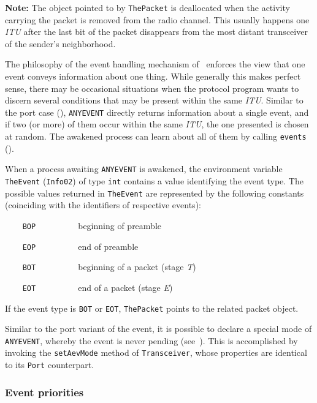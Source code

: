 \medskip

\noindent
{\bf Note:}
The object pointed to by {\tt ThePacket} is deallocated when the activity
carrying the packet is removed from the radio channel.
This usually happens one {\em ITU\/} after the last bit of the packet
disappears from the most distant transceiver of the sender's neighborhood.

\medskip

The philosophy of the event handling mechanism of \smurph\ enforces the
view that one event conveys information about one thing.
While generally this makes perfect sense, there may be occasional situations
when the protocol program wants to discern several conditions that may
be present within the same {\em ITU}.
Similar to the port case (), {\tt ANYEVENT} directly returns
information about a single event, and if
two (or more) of them occur within the same {\em ITU}, the one presented
is chosen at random.
The awakened process can learn about all of them
by calling {\tt events} ().

When a process awaiting {\tt ANYEVENT} is awakened, the environment
variable {\tt TheEvent} ({\tt Info02}) of type {\tt int}
contains a value identifying the event type.
The possible values returned in {\tt TheEvent} are represented by the
following constants (coinciding with the identifiers of respective events):

\bigskip

\noindent
{\tt ~~~~BOP~~~~~~~~~} beginning of preamble

\noindent
{\tt ~~~~EOP~~~~~~~~~} end of preamble

\noindent
{\tt ~~~~BOT~~~~~~~~~} beginning of a packet (stage {\em T\/})

\noindent
{\tt ~~~~EOT~~~~~~~~~} end of a packet (stage {\em E\/})

\bigskip

If the event type is {\tt BOT} or {\tt EOT},
{\tt ThePacket} points to the related packet object.

Similar to the port variant of the event, it is possible to
declare a special mode of {\tt ANYEVENT}, whereby the event is never pending
(see~).
This is accomplished by invoking the {\tt setAevMode} method of
{\tt Transceiver}, whose properties are identical to its {\tt Port}
counterpart.

\subsubsection{Event priorities}
\label{rm_tr_pp_ep}

